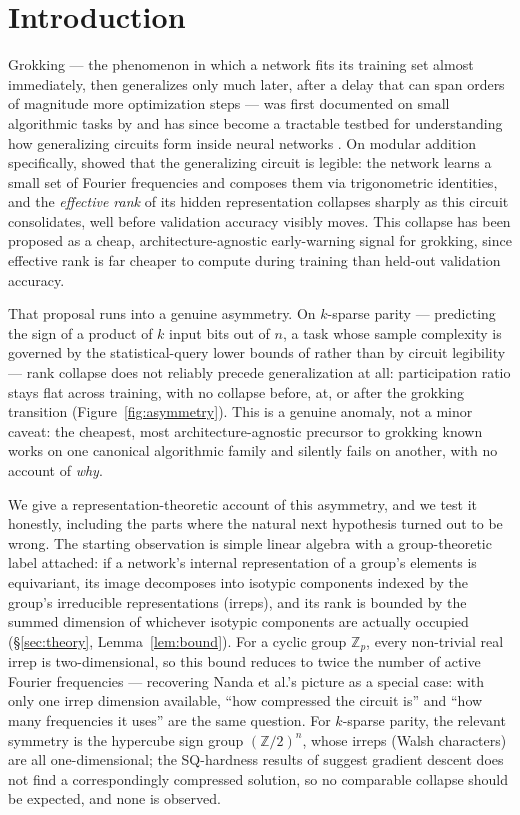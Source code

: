 \documentclass{article}
\begin{document}
\section{Introduction}
\label{sec:intro}

Grokking --- the phenomenon in which a network fits its training set almost
immediately, then generalizes only much later, after a delay that can span
orders of magnitude more optimization steps --- was first documented on small
algorithmic tasks by \citet{power2022grokking} and has since become a
tractable testbed for understanding how generalizing circuits form inside
neural networks
\citep{liu2023omnigrok,thilak2022slingshot,nanda2023progress,zhong2023clock}.
On modular addition specifically, \citet{nanda2023progress} showed that the
generalizing circuit is legible: the network learns a small set of Fourier
frequencies and composes them via trigonometric identities, and the
\emph{effective rank} of its hidden representation collapses sharply as this
circuit consolidates, well before validation accuracy visibly moves. This
collapse has been proposed as a cheap, architecture-agnostic early-warning
signal for grokking, since effective rank is far cheaper to compute during
training than held-out validation accuracy.

That proposal runs into a genuine asymmetry. On $k$-sparse parity ---
predicting the sign of a product of $k$ input bits out of $n$, a task whose
sample complexity is governed by the statistical-query lower bounds of
\citet{barak2022hidden} rather than by circuit legibility --- rank collapse
does not reliably precede generalization at all: participation ratio stays
flat across training, with no collapse before, at, or after the grokking
transition (Figure~\ref{fig:asymmetry}). This is a genuine anomaly, not a minor
caveat: the cheapest, most architecture-agnostic precursor to grokking known
works on one canonical algorithmic family and silently fails on another, with
no account of \emph{why}.

We give a representation-theoretic account of this asymmetry, and we test it
honestly, including the parts where the natural next hypothesis turned out to
be wrong. The starting observation is simple linear algebra with a
group-theoretic label attached: if a network's internal representation of a
group's elements is equivariant, its image decomposes into isotypic
components indexed by the group's irreducible representations (irreps), and
its rank is bounded by the summed dimension of whichever isotypic components
are actually occupied (\S\ref{sec:theory}, Lemma~\ref{lem:bound}). For a
cyclic group $\mathbb{Z}_p$, every non-trivial real irrep is
two-dimensional, so this bound reduces to twice the number of active Fourier
frequencies --- recovering Nanda et al.'s picture as a special case: with
only one irrep dimension available, ``how compressed the circuit is'' and
``how many frequencies it uses'' are the same question. For $k$-sparse
parity, the relevant symmetry is the hypercube sign group $(\mathbb{Z}/2)^n$,
whose irreps (Walsh characters) are all one-dimensional; the SQ-hardness
results of \citet{barak2022hidden} suggest gradient descent does not find a
correspondingly compressed solution, so no comparable collapse should be
expected, and none is observed.
\end{document}
